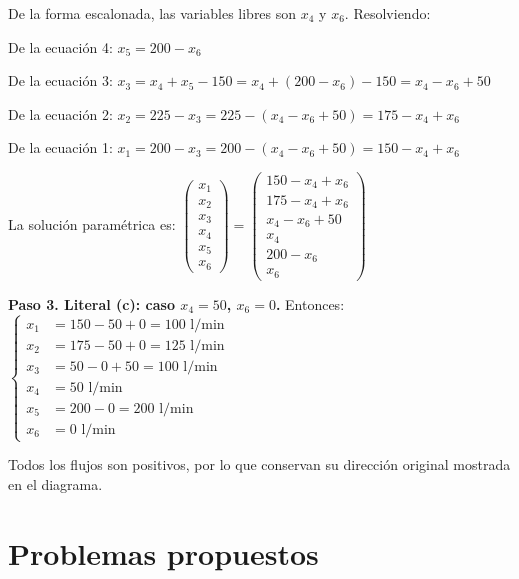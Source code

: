 \begin{prob}
\begin{myproof}
De la forma escalonada, las variables libres son $x_4$ y $x_6$. Resolviendo:

De la ecuación 4: $x_5 = 200 - x_6$

De la ecuación 3: $x_3 = x_4 + x_5 - 150 = x_4 + (200-x_6) - 150 = x_4 - x_6 + 50$

De la ecuación 2: $x_2 = 225 - x_3 = 225 - (x_4 - x_6 + 50) = 175 - x_4 + x_6$

De la ecuación 1: $x_1 = 200 - x_3 = 200 - (x_4 - x_6 + 50) = 150 - x_4 + x_6$

La solución paramétrica es: $\boxed{\begin{pmatrix}
x_1 \\ x_2 \\ x_3 \\ x_4 \\ x_5 \\ x_6
\end{pmatrix} = \begin{pmatrix}
150 - x_4 + x_6 \\
175 - x_4 + x_6 \\
x_4 - x_6 + 50 \\
x_4 \\
200 - x_6 \\
x_6
\end{pmatrix}}$

\textbf{Paso 3. Literal (c): caso $x_4=50$, $x_6=0$.} Entonces: $\begin{cases}
x_1 &= 150 - 50 + 0 = 100 \text{ l/min}\\
x_2 &= 175 - 50 + 0 = 125 \text{ l/min}\\
x_3 &= 50 - 0 + 50 = 100 \text{ l/min}\\
x_4 &= 50 \text{ l/min}\\
x_5 &= 200 - 0 = 200 \text{ l/min}\\
x_6 &= 0 \text{ l/min}
\end{cases}$

Todos los flujos son positivos, por lo que conservan su dirección original mostrada en el diagrama.
\end{myproof}
\end{prob}

\section{Problemas propuestos}

